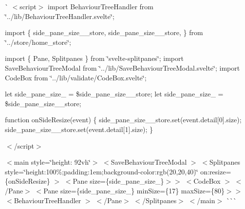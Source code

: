 \`{} $<$script$>$ import Behaviour\+Tree\+Handler from \char`\"{}../lib/\+Behaviour\+Tree\+Handler.\+svelte\char`\"{};

import \{ side\+\_\+pane\+\_\+size\+\_\+\_\+store, side\+\_\+pane\+\_\+size\+\_\+\_\+store, \} from \char`\"{}../store/home\+\_\+store\char`\"{};

import \{ Pane, Splitpanes \} from \char`\"{}svelte-\/splitpanes\char`\"{}; import Save\+Behaviour\+Tree\+Modal from \char`\"{}../lib/\+Save\+Behaviour\+Tree\+Modal.\+svelte\char`\"{}; import Code\+Box from \char`\"{}../lib/validate/\+Code\+Box.\+svelte\char`\"{};

let side\+\_\+pane\+\_\+size\+\_ = \$side\+\_\+pane\+\_\+size\+\_\+\_\+store; let side\+\_\+pane\+\_\+size\+\_ = \$side\+\_\+pane\+\_\+size\+\_\+\_\+store;

function on\+Side\+Resize(event) \{ side\+\_\+pane\+\_\+size\+\_\+\_\+store.\+set(event.\+detail\mbox{[}0\mbox{]}.size); side\+\_\+pane\+\_\+size\+\_\+\_\+store.\+set(event.\+detail\mbox{[}1\mbox{]}.size); \}

$<$/script$>$

$<$main style=\char`\"{}height\+: 92vh\char`\"{}$>$ $<$\+Save\+Behaviour\+Tree\+Modal $>$ $<$\+Splitpanes         style=\char`\"{}height\+:100\%;padding\+:1em;background-\/color\+:rgb(20,20,40)\char`\"{}         on\+:resize=\{on\+Side\+Resize\}     $>$ $<$\+Pane size=\{side\+\_\+pane\+\_\+size\+\_\}$>$$>$ $<$\+Code\+Box $>$ $<$/\+Pane$>$ $<$\+Pane size=\{side\+\_\+pane\+\_\+size\+\_\} min\+Size=\{17\} max\+Size=\{80\}$>$$>$ $<$\+Behaviour\+Tree\+Handler $>$ $<$/\+Pane$>$ $<$/\+Splitpanes$>$ $<$/main$>$ \`{}\`{}\`{} 